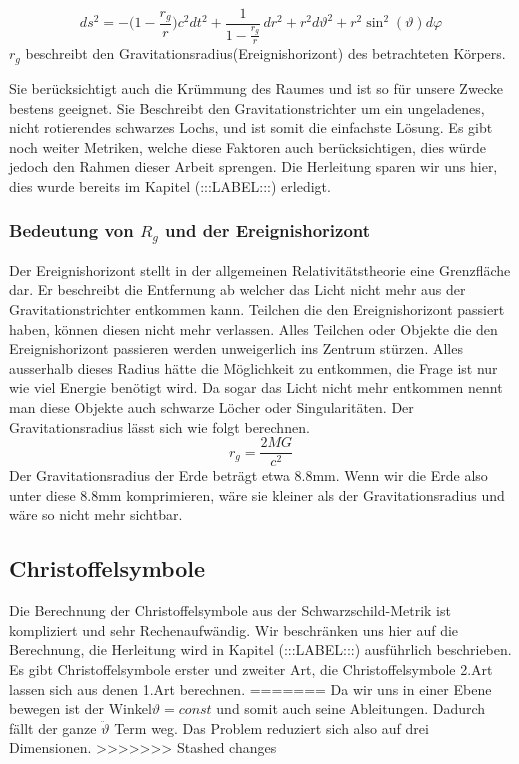 \begin{refsection}
	\begin{equation}
	ds^2
	=
	-\biggl(1-\frac{r_g}r\biggr)c^2dt^2
	+
	\frac{1}{\displaystyle 1-\frac{r_g}r}\,dr^2 
	+
	r^2d\vartheta^2 
	+ 
	r^2\sin^2(\vartheta)d\varphi
	\end{equation}
	$r_g$ beschreibt den Gravitationsradius(Ereignishorizont) des betrachteten Körpers.
	
	Sie berücksichtigt auch die Krümmung des Raumes und ist so für unsere Zwecke bestens geeignet. Sie Beschreibt den Gravitationstrichter um ein ungeladenes, nicht rotierendes schwarzes Lochs, und ist somit die einfachste Lösung. Es gibt noch weiter Metriken, welche diese Faktoren auch berücksichtigen, dies würde jedoch den Rahmen dieser Arbeit sprengen.
	Die Herleitung sparen wir uns hier, dies wurde bereits im Kapitel (:::LABEL:::) erledigt. 

	\subsubsection{Bedeutung von $R_{g}$ und der Ereignishorizont}
	Der Ereignishorizont stellt in der allgemeinen Relativitätstheorie eine Grenzfläche dar. Er beschreibt die Entfernung ab welcher das Licht nicht mehr aus der Gravitationstrichter entkommen kann. Teilchen die den Ereignishorizont passiert haben, können diesen nicht mehr verlassen. Alles Teilchen oder Objekte die den Ereignishorizont passieren werden unweigerlich ins Zentrum stürzen. Alles ausserhalb dieses Radius hätte die Möglichkeit zu entkommen, die Frage ist nur wie viel Energie benötigt wird. Da sogar das Licht nicht mehr entkommen nennt man diese Objekte auch schwarze Löcher oder Singularitäten.
	Der Gravitationsradius lässt sich wie folgt berechnen.
	\begin{equation} \label{Gravitationsradius}
	r_{g}= \frac{2MG}{c^2}
	\end{equation}
	Der Gravitationsradius der Erde beträgt etwa 8.8mm. Wenn wir die Erde also unter diese 8.8mm komprimieren, wäre sie kleiner als der Gravitationsradius und wäre so nicht mehr sichtbar.
	
	\subsection{Christoffelsymbole}
	
	Die Berechnung der Christoffelsymbole aus der Schwarzschild-Metrik ist kompliziert und sehr Rechenaufwändig. Wir beschränken uns hier auf die Berechnung, die Herleitung wird in Kapitel (:::LABEL:::) ausführlich beschrieben. Es gibt Christoffelsymbole erster und zweiter Art, die Christoffelsymbole 2.Art lassen sich aus denen 1.Art berechnen.
=======
	Da wir uns in einer Ebene bewegen ist der Winkel$\vartheta = const$ und somit auch seine Ableitungen. Dadurch fällt der ganze $\ddot{\vartheta}$ Term weg. Das Problem reduziert sich also auf drei Dimensionen.	
>>>>>>> Stashed changes
	

\end{refsection}
